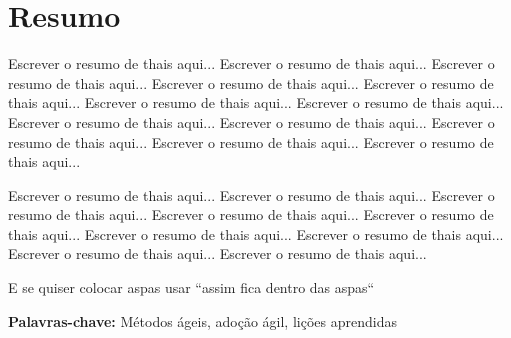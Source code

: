 \chapter*{Resumo}

Escrever o resumo de thais aqui... Escrever o resumo de thais aqui... Escrever o resumo de thais aqui... Escrever o resumo de thais aqui... Escrever o resumo de thais aqui... Escrever o resumo de thais aqui... Escrever o resumo de thais aqui... Escrever o resumo de thais aqui... Escrever o resumo de thais aqui... Escrever o resumo de thais aqui... Escrever o resumo de thais aqui... Escrever o resumo de thais aqui... 

Escrever o resumo de thais aqui... Escrever o resumo de thais aqui... Escrever o resumo de thais aqui... Escrever o resumo de thais aqui... Escrever o resumo de thais aqui... Escrever o resumo de thais aqui... Escrever o resumo de thais aqui... Escrever o resumo de thais aqui... Escrever o resumo de thais aqui... 

E se quiser colocar aspas usar ``assim fica dentro das aspas``

\textbf{Palavras-chave:} Métodos ágeis, adoção ágil, lições aprendidas
